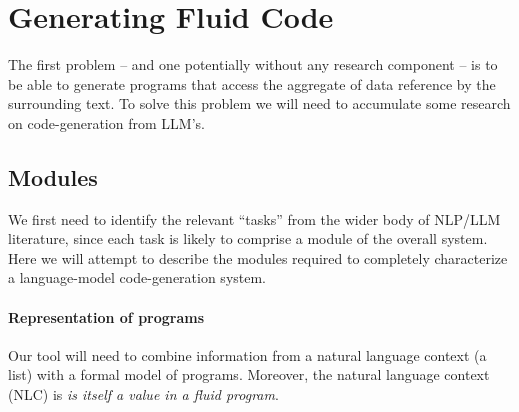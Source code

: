 \section{Generating Fluid Code}
\label{sec:generate-fluid}

The first problem -- and one potentially without any research component -- is to be able
to generate  programs that access the aggregate of data reference by the surrounding text.
To solve this problem we will need to accumulate some research on code-generation from LLM's.

\subsection{Modules}
We first need to identify the relevant ``tasks'' from the wider body of NLP/LLM literature,
since each task is likely to comprise a module of the overall system. Here we will attempt
to describe the modules required to completely characterize a language-model code-generation
system.

\paragraph*{Representation of  programs}
Our tool will need to combine information from a natural language context (a  list)
with a formal model of  programs. Moreover, the natural language context (NLC) is
\textit{is itself a value in a fluid program}. 

